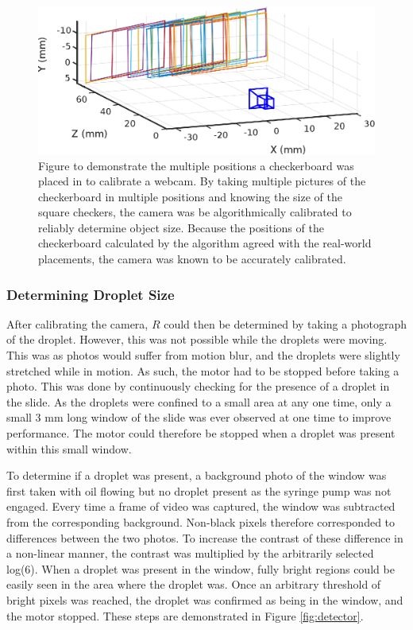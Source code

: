 \documentclass{physics_article_B}
\begin{document}
                \begin{figure}[H]
                    \centering\includegraphics[scale=0.86]{Figures/CameraExtrinsics.eps}
                    \caption{Figure to demonstrate the multiple positions a checkerboard was placed in to calibrate a webcam. By taking multiple pictures of the checkerboard in multiple positions and knowing the size of the square checkers, the camera was be algorithmically calibrated to reliably determine object size. Because the positions of the checkerboard calculated by the algorithm agreed with the real-world placements, the camera was known to be accurately calibrated.}\label{fig:calib}
                \end{figure}
            
        \subsubsection{Determining Droplet Size\label{sect:method:vision:size}}
                
                After calibrating the camera, $R$ could then be determined by taking a photograph of the droplet. However, this was not possible while the droplets were moving. This was as photos would suffer from motion blur, and the droplets were slightly stretched while in motion. As such, the motor had to be stopped before taking a photo. This was done by continuously checking for the presence of a droplet in the slide. As the droplets were confined to a small area at any one time, only a small 3 mm long window of the slide was ever observed at one time to improve performance. The motor could therefore be stopped when a droplet was present within this small window. 
                
                To determine if a droplet was present, a background photo of the window was first taken with oil flowing but no droplet present as the syringe pump was not engaged. Every time a frame of video was captured, the window was subtracted from the corresponding background. Non-black pixels therefore corresponded to differences between the two photos. To increase the contrast of these difference in a non-linear manner, the contrast was multiplied by the arbitrarily selected log(6). When a droplet was present in the window, fully bright regions could be easily seen in the area where the droplet was. Once an arbitrary threshold of bright pixels was reached, the droplet was confirmed as being in the window, and the motor stopped. These steps are demonstrated in Figure \ref{fig:detector}.
            
\end{document}
